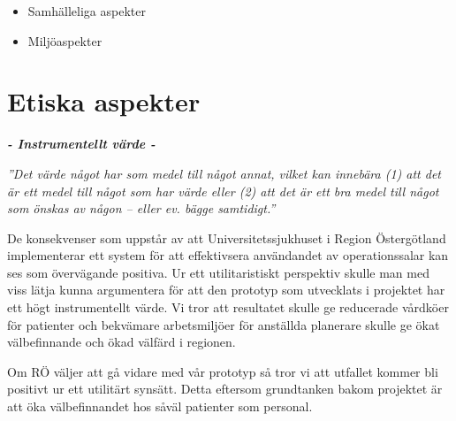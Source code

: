 \begin{itemize}

\item Samhälleliga aspekter

\item Miljöaspekter

\end{itemize}

\section{Etiska aspekter}

\begin{minipage}{1\linewidth}
\begin{center}
\textbf{\textit{- Instrumentellt värde -}}

\emph{''Det värde något har som medel till något annat, vilket kan innebära (1) att det är ett medel till något som har värde eller (2) att det är ett bra medel till något som önskas av någon – eller ev. bägge samtidigt.''} \cite{ne}

\end{center}
\end{minipage}

De konsekvenser som uppstår av att Universitetssjukhuset i Region Östergötland implementerar ett system för att effektivsera användandet av operationssalar kan ses som övervägande positiva. Ur ett utilitaristiskt perspektiv skulle man med viss lätja kunna argumentera för att den prototyp som utvecklats i projektet har ett högt instrumentellt värde. Vi tror att resultatet skulle ge reducerade vårdköer för patienter och bekvämare arbetsmiljöer för anställda planerare skulle ge ökat välbefinnande och ökad välfärd i regionen. 

Om RÖ väljer att gå vidare med vår prototyp så tror vi att utfallet kommer bli positivt ur ett utilitärt synsätt. Detta eftersom grundtanken bakom projektet är att öka välbefinnandet hos såväl patienter som personal.